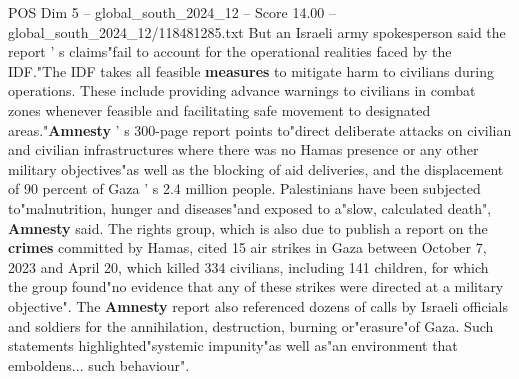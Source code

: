 \begin{textsample}{POS Dim 5 – global\_south\_2024\_12 – Score 14.00 – global\_south\_2024\_12/118481285.txt}
But an Israeli army spokesperson said the report ' s claims"fail to account for the operational realities faced by the IDF."The IDF takes all feasible \textbf{measures} to mitigate harm to civilians during operations.
These include providing advance warnings to civilians in combat zones whenever feasible and facilitating safe movement to designated areas."\textbf{Amnesty} ' s 300-page report points to"direct deliberate attacks on civilian and civilian infrastructures where there was no Hamas presence or any other military objectives"as well as the blocking of aid deliveries, and the displacement of 90 percent of Gaza ' s 2.4 million people.
Palestinians have been subjected to"malnutrition, hunger and diseases"and exposed to a"slow, calculated death", \textbf{Amnesty} said.
The rights group, which is also due to publish a report on the \textbf{crimes} committed by Hamas, cited 15 air strikes in Gaza between October 7, 2023 and April 20, which killed 334 civilians, including 141 children, for which the group found"no evidence that any of these strikes were directed at a military objective".
The \textbf{Amnesty} report also referenced dozens of calls by Israeli officials and soldiers for the annihilation, destruction, burning or"erasure"of Gaza.
Such statements highlighted"systemic impunity"as well as"an environment that emboldens... such behaviour".

\end{textsample}
